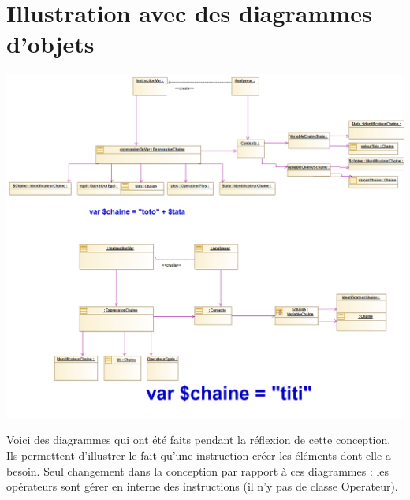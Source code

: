 \section{Illustration avec des diagrammes d'objets}
\begin{center}\includegraphics[scale=0.50]{./img/COO/COO_prototype_1/Objet}\end{center}
\par Voici des diagrammes qui ont été faits pendant la réflexion de cette conception. Ils permettent d'illustrer le fait qu'une instruction créer les éléments dont elle a besoin. Seul changement dans la conception par rapport à ces diagrammes : les opérateurs sont gérer en interne des instructions (il n'y pas de classe Operateur).